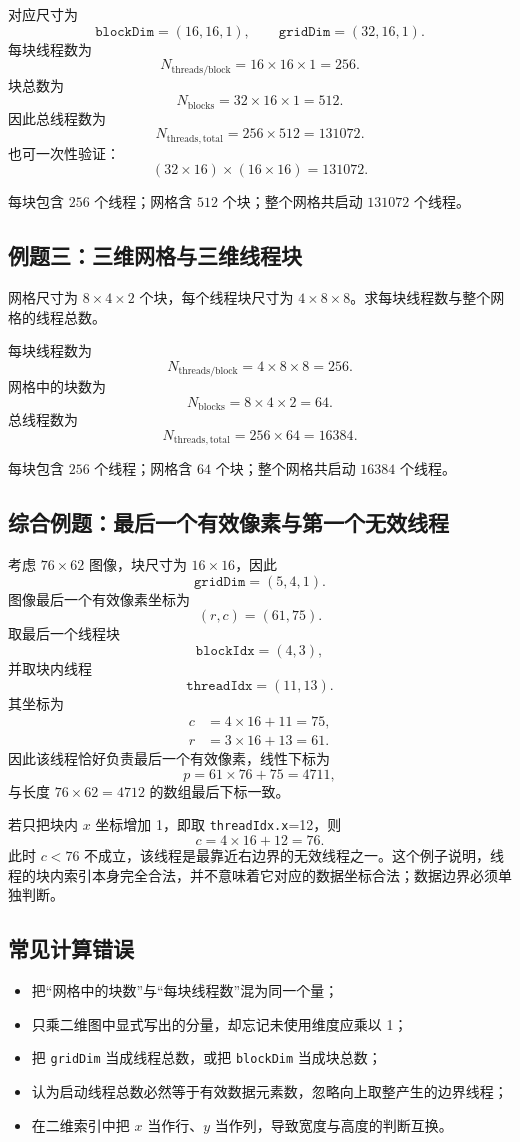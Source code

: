对应尺寸为
\[
\texttt{blockDim}=(16,16,1),
\qquad
\texttt{gridDim}=(32,16,1).
\]
每块线程数为
\[
N_{\mathrm{threads/block}}
=16\times16\times1
=256.
\]
块总数为
\[
N_{\mathrm{blocks}}
=32\times16\times1
=512.
\]
因此总线程数为
\[
N_{\mathrm{threads,total}}
=256\times512
=131072.
\]
也可一次性验证：
\[
(32\times16)\times(16\times16)=131072.
\]

\begin{keybox}[title=答案]
每块包含 $256$ 个线程；网格含 $512$ 个块；整个网格共启动 $131072$ 个线程。
\end{keybox}

\subsection{例题三：三维网格与三维线程块}

\begin{examplebox}[title=题目]
网格尺寸为 $8\times4\times2$ 个块，每个线程块尺寸为 $4\times8\times8$。求每块线程数与整个网格的线程总数。
\end{examplebox}

每块线程数为
\[
N_{\mathrm{threads/block}}
=4\times8\times8
=256.
\]
网格中的块数为
\[
N_{\mathrm{blocks}}
=8\times4\times2
=64.
\]
总线程数为
\[
N_{\mathrm{threads,total}}
=256\times64
=16384.
\]

\begin{keybox}[title=答案]
每块包含 $256$ 个线程；网格含 $64$ 个块；整个网格共启动 $16384$ 个线程。
\end{keybox}

\subsection{综合例题：最后一个有效像素与第一个无效线程}

考虑 $76\times62$ 图像，块尺寸为 $16\times16$，因此
\[
\texttt{gridDim}=(5,4,1).
\]
图像最后一个有效像素坐标为
\[
(r,c)=(61,75).
\]
取最后一个线程块
\[
\texttt{blockIdx}=(4,3),
\]
并取块内线程
\[
\texttt{threadIdx}=(11,13).
\]
其坐标为
\[
\begin{aligned}
c&=4\times16+11=75,\\
r&=3\times16+13=61.
\end{aligned}
\]
因此该线程恰好负责最后一个有效像素，线性下标为
\[
p=61\times76+75=4711,
\]
与长度 $76\times62=4712$ 的数组最后下标一致。

若只把块内 $x$ 坐标增加 1，即取 \texttt{threadIdx.x}=12，则
\[
c=4\times16+12=76.
\]
此时 $c<76$ 不成立，该线程是最靠近右边界的无效线程之一。这个例子说明，线程的块内索引本身完全合法，并不意味着它对应的数据坐标合法；数据边界必须单独判断。

\subsection{常见计算错误}

\begin{itemize}
  \item 把“网格中的块数”与“每块线程数”混为同一个量；
  \item 只乘二维图中显式写出的分量，却忘记未使用维度应乘以 1；
  \item 把 \texttt{gridDim} 当成线程总数，或把 \texttt{blockDim} 当成块总数；
  \item 认为启动线程总数必然等于有效数据元素数，忽略向上取整产生的边界线程；
  \item 在二维索引中把 $x$ 当作行、$y$ 当作列，导致宽度与高度的判断互换。
\end{itemize}
